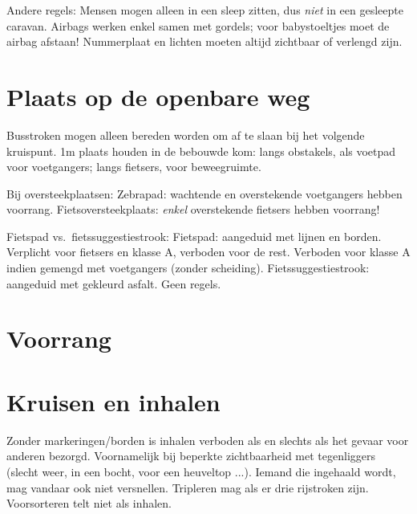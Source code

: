 \begin{outline}
\1 Andere regels:
	\2 Mensen mogen alleen in een sleep zitten, dus \emph{niet} in een gesleepte caravan.
	\2 Airbags werken enkel samen met gordels; voor babystoeltjes moet de airbag afstaan!
	\2 Nummerplaat en lichten moeten altijd zichtbaar of verlengd zijn.
\end{outline}

\section{Plaats op de openbare weg}
\begin{outline}
\1 Busstroken mogen alleen bereden worden om af te slaan bij het volgende kruispunt.
\1 1m plaats houden in de bebouwde kom:
	\2 langs obstakels, als voetpad voor voetgangers;
	\2 langs fietsers, voor beweegruimte.
	
\1 Bij oversteekplaatsen:
	\2 Zebrapad: wachtende en overstekende voetgangers hebben voorrang.
	\2 Fietsoversteekplaats: \emph{enkel} overstekende fietsers hebben voorrang!

\1 Fietspad vs.\ fietssuggestiestrook:
	\2 Fietspad: aangeduid met lijnen en borden. 
		\3 Verplicht voor fietsers en klasse A, verboden voor de rest.
		\3 Verboden voor klasse A indien gemengd met voetgangers (zonder scheiding).
	\2 Fietssuggestiestrook: aangeduid met gekleurd asfalt. Geen regels.
\end{outline}

\section{Voorrang}

\section{Kruisen en inhalen}
\begin{outline}
\1 Zonder markeringen/borden is inhalen verboden als en slechts als het gevaar voor anderen bezorgd.
	\2 Voornamelijk bij beperkte zichtbaarheid met tegenliggers (slecht weer, in een bocht, voor een heuveltop ...).
	\2 Iemand die ingehaald wordt, mag vandaar ook niet versnellen.
\1 Tripleren mag als er drie rijstroken zijn.
\1 Voorsorteren telt niet als inhalen.
\end{outline}


